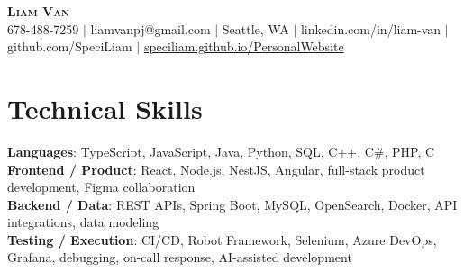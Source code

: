 \documentclass[letterpaper,11pt]{article}
\begin{document}

%
\begin{center}
    \textbf{\Huge \scshape Liam Van} \\ \vspace{1pt}
    \small 678-488-7259 $|$ \small {liamvanpj@gmail.com} $|$ Seattle, WA
 {{$|$ linkedin.com/in/liam-van} {$|$ github.com/SpeciLiam} {$|$ \href{https://speciliam.github.io/PersonalWebsite}{speciliam.github.io/PersonalWebsite}}}

\end{center}

\section{Technical Skills}
 \begin{itemize}[leftmargin=0.15in, label={}]
    \small{\item{
     \textbf{Languages}{: TypeScript, JavaScript, Java, Python, SQL, C++, C\#, PHP, C} \\
     \textbf{Frontend / Product}{: React, Node.js, NestJS, Angular, full-stack product development, Figma collaboration} \\
     \textbf{Backend / Data}{: REST APIs, Spring Boot, MySQL, OpenSearch, Docker, API integrations, data modeling} \\
     \textbf{Testing / Execution}{: CI/CD, Robot Framework, Selenium, Azure DevOps, Grafana, debugging, on-call response, AI-assisted development} \\
    }}
 \end{itemize}
%
\end{document}

